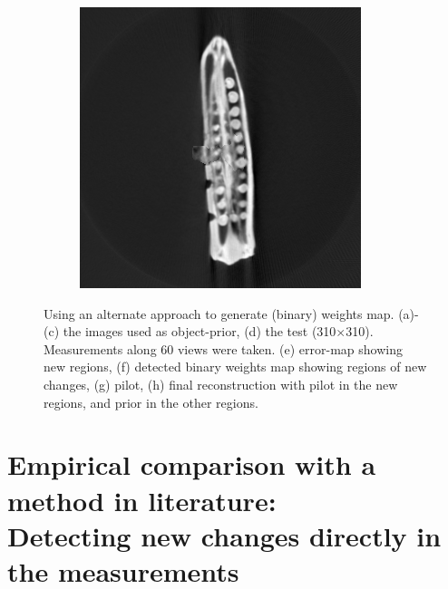 \documentclass{article}
\begin{document}
\begin{figure}[]
\begin{subfigure}[b]{0.24\linewidth}
        \caption{}
    \end{subfigure}    
    \begin{subfigure}[b]{0.24\linewidth}
        \includegraphics[width=\textwidth]{../images/svm/okra/resultStitched_svm.png}
        \caption{}
     \end{subfigure}
     \caption[Selecting $k$]{Using an alternate approach to generate (binary) weights map. (a)-(c) the images used as object-prior, (d) the test (310$\times$310). Measurements along $60$ views were taken. (e) error-map showing new regions, (f) detected binary weights map showing regions of new changes, (g) pilot, (h) final reconstruction with pilot in the new regions, and prior in the other regions. } %
\label{fig:okra_svm}
\end{figure}
\clearpage



\newpage

\section{Empirical comparison with a method in literature:\\ Detecting new changes directly in the measurements}
\end{document}
